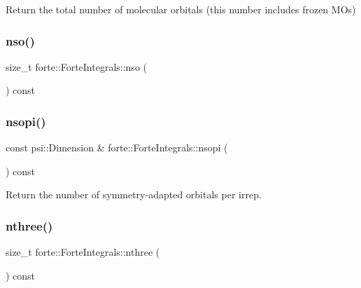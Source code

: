 Return the total number of molecular orbitals (this number includes frozen M\+Os) 

\mbox{\label{classforte_1_1_forte_integrals_aa008ab25f2c1a11cbe6b7ba43ca6179d}} 
\subsubsection{\texorpdfstring{nso()}{nso()}}
{\footnotesize\ttfamily size\+\_\+t forte\+::\+Forte\+Integrals\+::nso (\begin{DoxyParamCaption}{ }\end{DoxyParamCaption}) const}

\mbox{\label{classforte_1_1_forte_integrals_afa631a01ad69a803b065734067671704}} 
\subsubsection{\texorpdfstring{nsopi()}{nsopi()}}
{\footnotesize\ttfamily const psi\+::\+Dimension \& forte\+::\+Forte\+Integrals\+::nsopi (\begin{DoxyParamCaption}{ }\end{DoxyParamCaption}) const}



Return the number of symmetry-\/adapted orbitals per irrep. 

\mbox{\label{classforte_1_1_forte_integrals_af04858e7813556747745f90ffbda81a4}} 
\subsubsection{\texorpdfstring{nthree()}{nthree()}}
{\footnotesize\ttfamily size\+\_\+t forte\+::\+Forte\+Integrals\+::nthree (\begin{DoxyParamCaption}{ }\end{DoxyParamCaption}) const\hspace{0.3cm}{\ttfamily [virtual]}}



